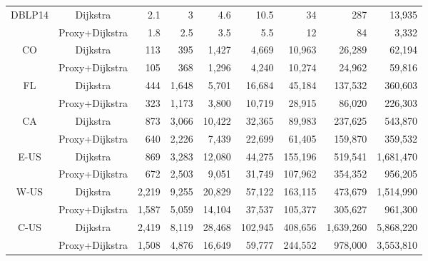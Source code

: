 \begin{table}[t!]
\begin{center}
\begin{tabular}{|c|c||r|r|r|r|r|r|r|}
 \multirow{2}{*}{DBLP14} & Dijkstra & 2.1          & 3   & 4.6 & 10.5 & 34 & 287 & 13,935 \\ \cline{2-9}
                       & Proxy+Dijkstra & {1.8} & {2.5} & {3.5} & {5.5} & {12} & {84} & {3,332} \\ \hline
 \multirow{2}{*}{CO}     & Dijkstra & 113 & 395 & 1,427 & 4,669 & 10,963 & 26,289 & 62,194 \\ \cline{2-9}
                       & Proxy+Dijkstra & {105} & {368} & {1,296} & {4,240} & {10,274} & {24,962} & {59,816} \\ \hline
 \multirow{2}{*}{FL}     & Dijkstra & 444 & 1,648 & 5,701 & 16,684 & 45,184 & 137,532 & 360,603 \\ \cline{2-9}
                       & Proxy+Dijkstra & {323} & {1,173} & {3,800} & {10,719} & {28,915} & {86,020}  & {226,303} \\ \hline
 \multirow{2}{*}{CA}     & Dijkstra & 873 & 3,066 & 10,422 & 32,365 & 89,983 & 237,625 & 543,870 \\ \cline{2-9}
                       & Proxy+Dijkstra & {640} & {2,226} & {7,439}  & {22,699} & {61,405} & {159,870} & {359,532} \\ \hline
 \multirow{2}{*}{E-US}   & Dijkstra & 869 & 3,283 & 12,080 & 44,275 & 155,196 & 519,541 & 1,681,470 \\ \cline{2-9}
                       & Proxy+Dijkstra & {672} & {2,503} & {9,051}  & {31,749} & {107,962} & {354,352} & {956,205} \\ \hline
 \multirow{2}{*}{W-US}   & Dijkstra & 2,219 & 9,255 & 20,829 & 57,122 & 163,115 & 473,679 & 1,514,990 \\ \cline{2-9}
                       & Proxy+Dijkstra & {1,587} & {5,059} & {14,104} & {37,537} & {105,377} & {305,627} & {961,300} \\ \hline
 \multirow{2}{*}{C-US}   & Dijkstra & 2,419 & 8,119 & 28,468 & 102,945 & 408,656 & 1,639,260 & 5,868,220 \\ \cline{2-9}
                       & Proxy+Dijkstra & {1,508} & {4,876} & {16,649} & {59,777} & {244,552} & {978,000} & {3,553,810} \\ \hline
\end{tabular}
\end{center}
\vspace{-2ex}
\end{table}

